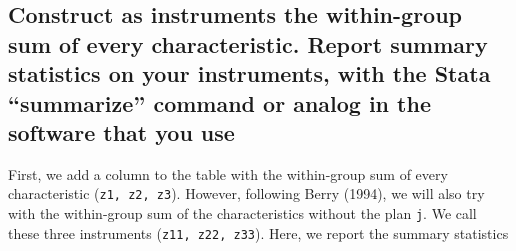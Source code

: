\documentclass[]{article}
\newenvironment{Shaded}{\begin{snugshade}}{\end{snugshade}}
\newcommand{\DataTypeTok}[1]{\textcolor[rgb]{0.13,0.29,0.53}{#1}}
\newcommand{\DecValTok}[1]{\textcolor[rgb]{0.00,0.00,0.81}{#1}}
\newcommand{\KeywordTok}[1]{\textcolor[rgb]{0.13,0.29,0.53}{\textbf{#1}}}
\newcommand{\NormalTok}[1]{#1}
\newcommand{\OperatorTok}[1]{\textcolor[rgb]{0.81,0.36,0.00}{\textbf{#1}}}
\newcommand{\OtherTok}[1]{\textcolor[rgb]{0.56,0.35,0.01}{#1}}
\newcommand{\StringTok}[1]{\textcolor[rgb]{0.31,0.60,0.02}{#1}}
\begin{document}
\hypertarget{construct-as-instruments-the-within-group-sum-of-every-characteristic.-report-summary-statistics-on-your-instruments-with-the-stata-summarize-command-or-analog-in-the-software-that-you-use}{%
\subsection{Construct as instruments the within-group sum of every
characteristic. Report summary statistics on your instruments, with the
Stata ``summarize'' command or analog in the software that you
use}\label{construct-as-instruments-the-within-group-sum-of-every-characteristic.-report-summary-statistics-on-your-instruments-with-the-stata-summarize-command-or-analog-in-the-software-that-you-use}}

First, we add a column to the table with the within-group sum of every
characteristic (\texttt{z1,\ z2,\ z3}). However, following Berry (1994),
we will also try with the within-group sum of the characteristics
without the plan \texttt{j}. We call these three instruments
(\texttt{z11,\ z22,\ z33}). Here, we report the summary statistics

\begin{Shaded}
\end{Shaded}
\end{document}
